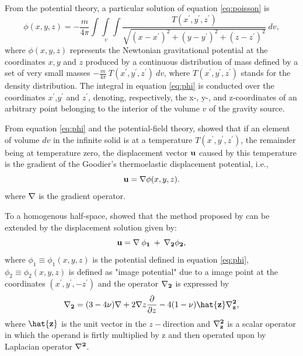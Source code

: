 \documentclass[journal abbreviation, manuscript]{copernicus}
\begin{document}
From the potential theory, a particular  solution of equation \ref{eq:poisson} is
\begin{equation}
\phi(x,y,z) = -  \frac{m}{4 \pi} \int\int\limits_{v}\int \frac{T(x^{\prime}, y^{\prime}, z^{\prime} )}{\sqrt{(x - x^{\prime})^{2} + (y - y^{\prime})^{2} + (z - z^{\prime})^{2}}} \: dv,
\label{eq:phi}
\end{equation}
where $\phi(x,y,z)$ represents the Newtonian gravitational potential \citep{Kellogg29} at the coordinates $x, y$ and $z$ produced by a continuous distribution of mass defined by a set of very small masses $ -  \frac{m}{4 \pi}  \: T( x^{\prime}, y^{\prime}, z^{\prime} ) \: dv$, where $T(x^{\prime}, y^{\prime}, z^{\prime}) $ stands for the density distribution. 
The integral in equation \ref{eq:phi} is conducted over the coordinates $x^{\prime}$,$y^{\prime}$ and $z^{\prime}$, denoting, respectively, the x-, y-, and z-coordinates of an arbitrary point belonging to the interior of the volume $v$ of the gravity source. 


From equation \ref{eq:phi} and the potential-field theory, \citet{Goodier37} showed that if an element of volume $dv$ in the infinite solid is at a temperature $T(x^{\prime}, y^{\prime}, z^{\prime}) $, the remainder being at temperature zero, the displacement vector $\bf{u}$ caused by this temperature is the gradient of the Goodier’s thermoelastic displacement potential, i.e.,
\begin{equation}
{\bf{u}} = {\bf {\nabla}} \phi(x,y,z). 
\label{eq:displacement-general}
\end{equation}
where $\bf{\nabla}$ is the gradient operator.  

To a homogenous half-space, \citet{Mindlin&Cheng50} showed that the method proposed by  \citet{Goodier37}  can be extended by the displacement solution given by:
\begin{equation}
\bf{u} = {\bf{\nabla}} \: \phi_{1} \: + \: {\bf{{\nabla}_{2}}} \phi_{2}, 
\label{eq:displacement-solution}
\end{equation}
where $\phi_{1} \equiv \phi_{1}(x,y,z)$ is the potential defined in equation \ref{eq:phi}, 
$\phi_{2} \equiv  \phi_{2}(x,y,z)$
is defined as "image potential" \citep{Segall92} due to a image point at the coordinates
$(x^{\prime}, y^{\prime}, -z^{\prime} )$ and the operator $\bf{{\nabla}_{2}}$ is expressed by
\begin{equation}
{\bf{{\nabla}_{2}}} = (3 - 4\nu){\bf{\nabla}} + 2 {\bf{\nabla}} z \frac{\partial }{\partial z}  - 4(1- \nu){\bf{\hat{z}}} {\bf{{\nabla}^{2}_{z}}},
\label{eq:nabla2}
\end{equation}
where ${\bf{\hat{z}}}$ is the unit vector in the $z-$direction and 
${\bf{{\nabla}^{2}_{z}}}$ is a scalar operator in which the operand is firtly multiplied by z and then operated upon by Laplacian operator ${\bf{\nabla}^{2}}$. 
\end{document}
